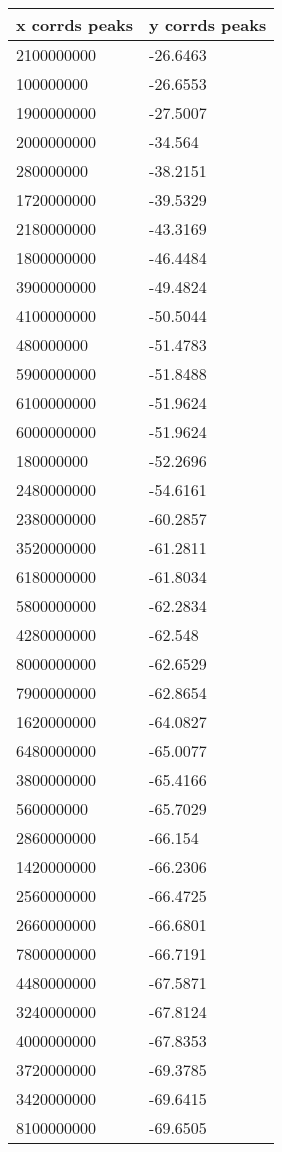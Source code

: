 \begin{tabular}{ll}
x corrds peaks & y corrds peaks \\ 
\hline 
2100000000 & -26.6463 \\ 
100000000 & -26.6553 \\ 
1900000000 & -27.5007 \\ 
2000000000 & -34.564 \\ 
280000000 & -38.2151 \\ 
1720000000 & -39.5329 \\ 
2180000000 & -43.3169 \\ 
1800000000 & -46.4484 \\ 
3900000000 & -49.4824 \\ 
4100000000 & -50.5044 \\ 
480000000 & -51.4783 \\ 
5900000000 & -51.8488 \\ 
6100000000 & -51.9624 \\ 
6000000000 & -51.9624 \\ 
180000000 & -52.2696 \\ 
2480000000 & -54.6161 \\ 
2380000000 & -60.2857 \\ 
3520000000 & -61.2811 \\ 
6180000000 & -61.8034 \\ 
5800000000 & -62.2834 \\ 
4280000000 & -62.548 \\ 
8000000000 & -62.6529 \\ 
7900000000 & -62.8654 \\ 
1620000000 & -64.0827 \\ 
6480000000 & -65.0077 \\ 
3800000000 & -65.4166 \\ 
560000000 & -65.7029 \\ 
2860000000 & -66.154 \\ 
1420000000 & -66.2306 \\ 
2560000000 & -66.4725 \\ 
2660000000 & -66.6801 \\ 
7800000000 & -66.7191 \\ 
4480000000 & -67.5871 \\ 
3240000000 & -67.8124 \\ 
4000000000 & -67.8353 \\ 
3720000000 & -69.3785 \\ 
3420000000 & -69.6415 \\ 
8100000000 & -69.6505 \\ 

\end{tabular}
